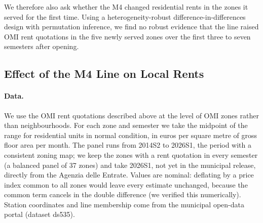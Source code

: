 We therefore also ask whether the M4 changed residential rents in the zones it served for the first time. Using a heterogeneity-robust difference-in-differences design \cite{callaway2021} with permutation inference, we find no robust evidence that the line raised OMI rent quotations in the five newly served zones over the first three to seven semesters after opening.



\subsection*{Effect of the M4 Line on Local Rents}

\paragraph{Data.} We use the OMI rent quotations described above at the level of OMI zones rather than neighbourhoods. %
For each zone and semester we take the midpoint of the range for residential units in normal condition, in euros per square metre of gross floor area per month. The panel runs from 2014S2 to 2026S1, the period with a consistent zoning map; we keep the zones with a rent quotation in every semester (a balanced panel of 37 zones) and take 2026S1, not yet in the municipal release, directly from the Agenzia delle Entrate. Values are nominal: deflating by a price index common to all zones would leave every estimate unchanged, because the common term cancels in the double difference (we verified this numerically). Station coordinates and line membership come from the municipal open-data portal (dataset ds535).

